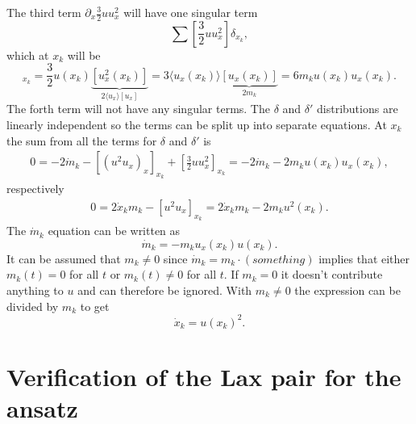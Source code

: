 \documentclass[english,master]{liumaiex}
\theoremstyle{plain}
\theoremstyle{definition}
\begin{document}
The third term $\partial_x \frac{3}{2}u u_x^2$ will have one singular term
\begin{equation}
	\sum [\frac{3}{2} u u_x^2] \delta_{x_k},
\end{equation}
which at $x_k$ will be
\begin{equation}
	[\frac{3}{2}u u_x^2]_{x_k} = \frac{3}{2}u(x_k) \underbrace{[u_x^2(x_k)]}_{2\langle u_x \rangle [u_x]} = 3 \langle u_x(x_k) \rangle \underbrace{[u_x(x_k)]}_{2m_k} = 6m_k u(x_k) u_x(x_k).
\end{equation}
%
The forth term will not have any singular terms. The $\delta$ and $\delta'$ distributions are linearly independent so the terms can be split up into separate equations. At $x_k$ the sum from all the terms for $\delta$ and $\delta'$ is
\begin{equation}
\begin{aligned}
	0 = -2 \dot{m}_k - [(u^2u_x)_x]_{x_k} + [\frac{3}{2}uu_x^2]_{x_k} = -2 \dot{m}_k - 2 m_k u(x_k) u_x(x_k),
\end{aligned}
\end{equation}
respectively
\begin{equation}
\begin{aligned}
	0 = 2 \dot{x}_k m_k - [u^2u_x]_{x_k} = 2 \dot{x}_k m_k - 2m_ku^2(x_k).
\end{aligned}
\end{equation}
%
The $\dot{m}_k$ equation can be written as
\begin{equation}
	\dot{m}_k = -m_ku_x(x_k)u(x_k).
\end{equation}
It can be assumed that $m_k \neq 0$ since $\dot{m}_k = m_k \cdot (something)$ implies that either $m_k(t) = 0$ for all $t$ or $m_k(t) \neq 0$ for all $t$. If $m_k = 0$ it doesn't contribute anything to $u$ and can therefore be ignored. With $m_k \neq 0$ the expression can be divided by $m_k$ to get
\begin{equation}
	\dot{x}_k = u(x_k)^2.
\end{equation}

\section{Verification of the Lax pair for the ansatz}


%
%
\newpage


\end{document}
